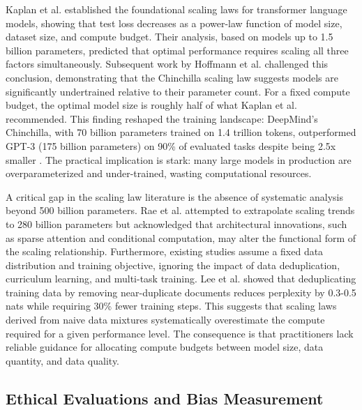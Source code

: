 \documentclass[journal]{IEEEtran}
\begin{document}
Kaplan et al. \cite{r11} established the foundational scaling laws for transformer language models, showing that test loss decreases as a power-law function of model size, dataset size, and compute budget. Their analysis, based on models up to 1.5 billion parameters, predicted that optimal performance requires scaling all three factors simultaneously. Subsequent work by Hoffmann et al. \cite{r12} challenged this conclusion, demonstrating that the Chinchilla scaling law suggests models are significantly undertrained relative to their parameter count. For a fixed compute budget, the optimal model size is roughly half of what Kaplan et al. recommended. This finding reshaped the training landscape: DeepMind's Chinchilla, with 70 billion parameters trained on 1.4 trillion tokens, outperformed GPT-3 (175 billion parameters) on 90\% of evaluated tasks despite being 2.5x smaller \cite{r12}. The practical implication is stark: many large models in production are overparameterized and under-trained, wasting computational resources.

A critical gap in the scaling law literature is the absence of systematic analysis beyond 500 billion parameters. Rae et al. \cite{r13} attempted to extrapolate scaling trends to 280 billion parameters but acknowledged that architectural innovations, such as sparse attention and conditional computation, may alter the functional form of the scaling relationship. Furthermore, existing studies assume a fixed data distribution and training objective, ignoring the impact of data deduplication, curriculum learning, and multi-task training. Lee et al. \cite{r14} showed that deduplicating training data by removing near-duplicate documents reduces perplexity by 0.3-0.5 nats while requiring 30\% fewer training steps. This suggests that scaling laws derived from naive data mixtures systematically overestimate the compute required for a given performance level. The consequence is that practitioners lack reliable guidance for allocating compute budgets between model size, data quantity, and data quality.

\subsection{Ethical Evaluations and Bias Measurement}
\end{document}
